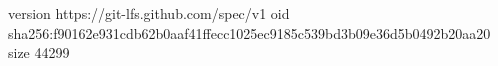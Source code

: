 version https://git-lfs.github.com/spec/v1
oid sha256:f90162e931cdb62b0aaf41ffecc1025ec9185c539bd3b09e36d5b0492b20aa20
size 44299
